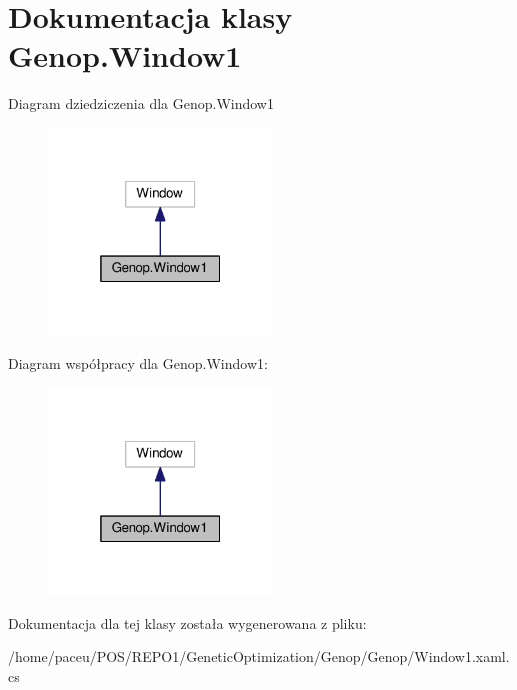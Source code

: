 \hypertarget{classGenop_1_1Window1}{}\section{Dokumentacja klasy Genop.\+Window1}
\label{classGenop_1_1Window1}


Diagram dziedziczenia dla Genop.\+Window1
\nopagebreak
\begin{figure}[H]
\begin{center}
\leavevmode
\includegraphics[width=169pt]{dc/de5/classGenop_1_1Window1__inherit__graph}
\end{center}
\end{figure}


Diagram współpracy dla Genop.\+Window1\+:
\nopagebreak
\begin{figure}[H]
\begin{center}
\leavevmode
\includegraphics[width=169pt]{d7/d3b/classGenop_1_1Window1__coll__graph}
\end{center}
\end{figure}


Dokumentacja dla tej klasy została wygenerowana z pliku\+:\begin{DoxyCompactItemize}
\item 
/home/paceu/\+P\+O\+S/\+R\+E\+P\+O1/\+Genetic\+Optimization/\+Genop/\+Genop/Window1.\+xaml.\+cs\end{DoxyCompactItemize}
